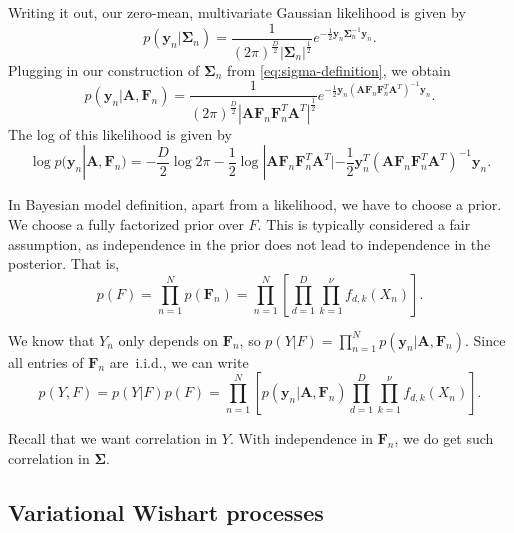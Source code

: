 Writing it out, our zero-mean, multivariate Gaussian likelihood is given by
\begin{equation}
  p(\mathbf{y}_n|\mathbf{\Sigma}_n) = \frac{1}{(2\pi)^{\frac{D}{2}} |\mathbf{\Sigma}_n|^{\frac{1}{2}}} e^{-\frac{1}{2} \mathbf{y}_n \mathbf{\Sigma}_n^{-1} \mathbf{y}_n}.
\end{equation}
Plugging in our construction of $\mathbf{\Sigma}_n$ from \cref{eq:sigma-definition}, we obtain
\begin{equation}
  p(\mathbf{y}_n|\mathbf{A},\mathbf{F}_n) = \frac{1}{(2\pi)^{\frac{D}{2}} |\mathbf{A} \mathbf{F}_n \mathbf{F}_n^T \mathbf{A}^T|^{\frac{1}{2}}} e^{-\frac{1}{2} \mathbf{y}_n (\mathbf{A} \mathbf{F}_n \mathbf{F}_n^T \mathbf{A}^T)^{-1} \mathbf{y}_n}.
\end{equation}
The log of this likelihood is given by
\begin{equation}
  \log p(\mathbf{y}_n|\mathbf{A},\mathbf{F}_n) = - \frac{D}{2} \log 2\pi - \frac{1}{2} \log |\mathbf{A} \mathbf{F}_n \mathbf{F}_n^T \mathbf{A}^T| - \frac{1}{2} \mathbf{y}_n^T (\mathbf{A} \mathbf{F}_n \mathbf{F}_n^T \mathbf{A}^T)^{-1} \mathbf{y}_n.
\end{equation}

In Bayesian model definition, apart from a likelihood, we have to choose a prior.
We choose a fully factorized prior over $F$.
This is typically considered a fair assumption, as independence in the prior does not lead to independence in the posterior.
That is,
\begin{equation}
  p(F) = \prod_{n=1}^N p(\mathbf{F}_n) = \prod_{n=1}^N \left[ \prod_{d=1}^D \prod_{k=1}^\nu f_{d,k}(X_n) \right].
\end{equation}

We know that $Y_n$ only depends on $\mathbf{F}_n$, so $p(Y|F) = \prod_{n=1}^N p(\mathbf{y}_n|\mathbf{A},\mathbf{F}_n)$.
Since all entries of $\mathbf{F}_n$ are~i.i.d., we can write
\begin{equation}
  p(Y,F) = p(Y|F)p(F) = \prod_{n=1}^N \left[ p(\mathbf{y}_n|\mathbf{A},\mathbf{F}_n) \prod_{d=1}^D \prod_{k=1}^\nu f_{d,k}(X_n) \right].
\end{equation}

Recall that we want correlation in $Y$.
With independence in $\mathbf{F}_n$, we do get such correlation in $\mathbf{\Sigma}$.

\subsection{Variational Wishart processes}

